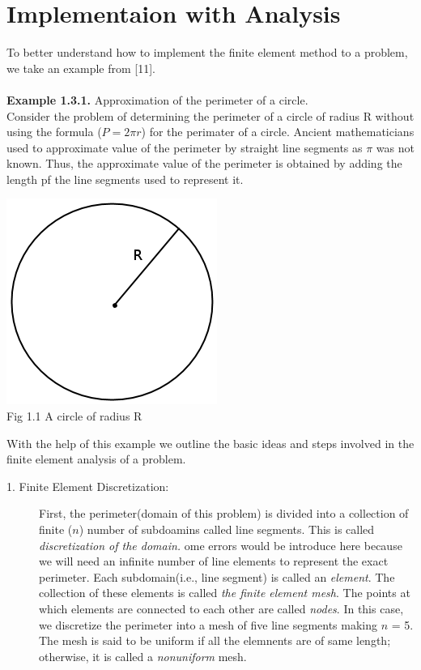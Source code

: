 \documentclass{report}
\numberwithin{equation}{chapter}
\begin{document}
\section{Implementaion with Analysis}
\begin{spacing}{1.5}
To better understand how to implement the finite element method to a problem, we take an example from [11].\\ \\
\textbf{Example 1.3.1.} Approximation of the perimeter of a circle.\\
Consider the problem of determining the perimeter of a circle of radius R without using the formula ($P = 2\pi r$) for the perimater of a circle. Ancient mathematicians used to approximate value of the perimeter by straight line segments as $\pi$ was not known. Thus, the approximate value of the perimeter is obtained by adding the length pf the line segments used to represent it.\\
\begin{center}
\includegraphics[scale=0.5]{circle}\\
Fig 1.1 A circle of radius R
\end{center}
With the help of this example we outline the basic ideas and steps involved in the finite element analysis of a problem.\\
\begin{description}
  \item[1. Finite Element Discretization:] First, the perimeter(domain of this problem) is divided into a collection of finite ($n$) number of subdoamins called line segments. This is called \textsl{discretization of the domain.} ome errors would be introduce here because we will need an infinite number of line elements to represent the exact perimeter. Each subdomain(i.e., line segment) is called an \textsl{element}. The collection of these elements is called \textsl{the finite element mesh}. The points at which elements are connected to each other are called \textsl{nodes}. In this case, we discretize the perimeter into a mesh of five line segments making $n$ = 5. The mesh is said to be uniform if all the elemnents are of same length; otherwise, it is called a \textsl{nonuniform} mesh.

\end{description}
\end{spacing}
\end{document}
